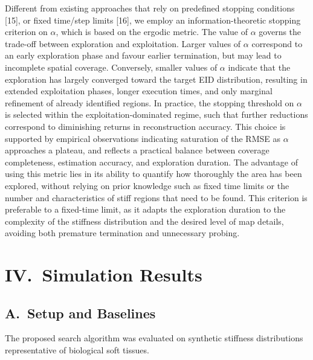 \documentclass[11pt]{article}
\begin{document}
Different from existing approaches that rely on predefined stopping
conditions [15], or fixed time/step limits [16], we employ an
information-theoretic stopping criterion on $\alpha$, which is based
on the ergodic metric. The value of $\alpha$ governs the trade-off
between exploration and exploitation. Larger values of $\alpha$
correspond to an early exploration phase and favour earlier
termination, but may lead to incomplete spatial coverage. Conversely,
smaller values of $\alpha$ indicate that the exploration has largely
converged toward the target EID distribution, resulting in extended
exploitation phases, longer execution times, and only marginal
refinement of already identified regions. In practice, the stopping
threshold on $\alpha$ is selected within the exploitation-dominated
regime, such that further reductions correspond to diminishing
returns in reconstruction accuracy. This choice is supported by
empirical observations indicating saturation of the RMSE as $\alpha$
approaches a plateau, and reflects a practical balance between
coverage completeness, estimation accuracy, and exploration duration.
The advantage of using this metric lies in its ability to quantify
how thoroughly the area has been explored, without relying on prior
knowledge such as fixed time limits or the number and characteristics
of stiff regions that need to be found. This criterion is preferable
to a fixed-time limit, as it adapts the exploration duration to the
complexity of the stiffness distribution and the desired level of map
details, avoiding both premature termination and unnecessary probing.

\section*{IV.\ Simulation Results}

\subsection*{A.\ Setup and Baselines}

The proposed search algorithm was evaluated on synthetic stiffness
distributions representative of biological soft tissues.
\end{document}
